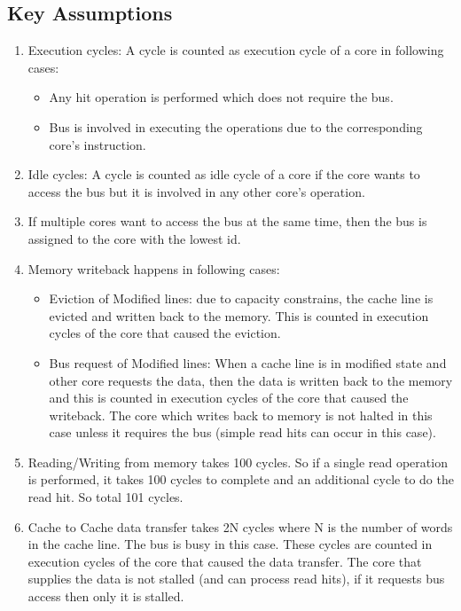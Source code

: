 \documentclass[10pt]{article}
\begin{document}
\subsection{Key Assumptions}
\begin{enumerate}[label=\textbf{\arabic*.}]
    \item Execution cycles: A cycle is counted as execution cycle of a core in following cases:
    \begin{itemize}
        \item Any hit operation is performed which does not require the bus.
        \item Bus is involved in executing the operations due to the corresponding core's instruction.
    \end{itemize}
    \item Idle cycles: A cycle is counted as idle cycle of a core if the core wants to access the bus but it is involved in any other core's operation.
    \item If multiple cores want to access the bus at the same time, then the bus is assigned to the core with the lowest id.
    \item Memory writeback happens in following cases:
    \begin{itemize}
        \item Eviction of Modified lines: due to capacity constrains, the cache line is evicted and written back to the memory. This is counted in execution cycles of the core that caused the eviction.
        \item Bus request of Modified lines: When a cache line is in modified state and other core requests the data, then the data is written back to the memory and this is counted in execution cycles of the core that caused the writeback. The core which writes back to memory is not halted in this case unless it requires the bus (simple read hits can occur in this case).
    \end{itemize}
    \item Reading/Writing from memory takes 100 cycles. So if a single read operation is performed, it takes 100 cycles to complete and an additional cycle to do the read hit. So total 101 cycles.
    \item Cache to Cache data transfer takes 2N cycles where N is the number of words in the cache line. The bus is busy in this case. These cycles are counted in execution cycles of the core that caused the data transfer. The core that supplies the data is not stalled (and can process read hits), if it requests bus access then only it is stalled.

\end{enumerate}
\end{document}
